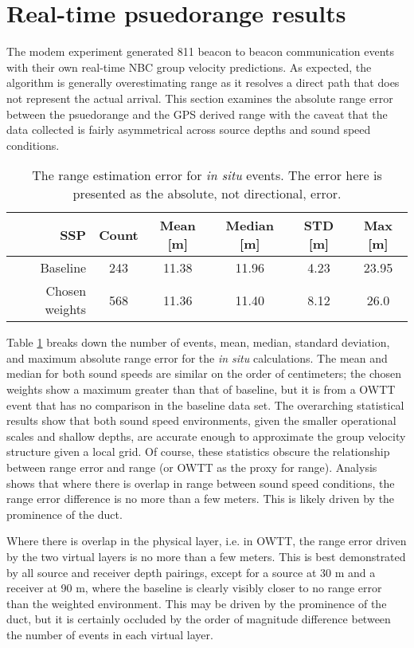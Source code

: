 \FloatBarrier
\section{\label{sec:4} Real-time psuedorange results}

The modem experiment generated 811 beacon to beacon communication events with their own real-time NBC group velocity predictions.
As expected, the algorithm is generally overestimating range as it resolves a direct path that does not represent the actual arrival.
This section examines the absolute range error between the psuedorange and the GPS derived range with the caveat that the data collected is fairly asymmetrical across source depths and sound speed conditions.

\begin{table}[h!]
\renewcommand{\arraystretch}{1.5}
\centering
\begin{tabular}{r|ccccc}
SSP & Count & Mean [m] & Median [m] & STD [m] & Max [m] \\ \hline
Baseline & 243 & 11.38 & 11.96 & 4.23 & 23.95 \\ 
Chosen weights & 568 & 11.36 & 11.40 & 8.12 & 26.0 \\
\end{tabular}
\caption[Range estimation error for \textit{in situ} events]{The range estimation error for \textit{in situ} events. The error here is presented as the absolute, not directional, error.}
\label{tab:rangeErrorInSitu}
\end{table}

Table \ref{tab:rangeErrorInSitu} breaks down the number of events, mean, median, standard deviation, and maximum absolute range error for the \textit{in situ} calculations.
The mean and median for both sound speeds are similar on the order of centimeters; the chosen weights show a maximum greater than that of baseline, but it is from a OWTT event that has no comparison in the baseline data set.
The overarching statistical results show that both sound speed environments, given the smaller operational scales and shallow depths, are accurate enough to approximate the group velocity structure given a local grid.
Of course, these statistics obscure the relationship between range error and range (or OWTT as the proxy for range).
Analysis shows that where there is overlap in range between sound speed conditions, the range error difference is no more than a few meters.
This is likely driven by the prominence of the duct.

Where there is overlap in the physical layer, i.e. in OWTT, the range error driven by the two virtual layers is no more than a few meters.
This is best demonstrated by all source and receiver depth pairings, except for a source at 30 m and a receiver at 90 m, where the baseline is clearly visibly closer to no range error than the weighted environment.
This may be driven by the prominence of the duct, but it is certainly occluded by the order of magnitude difference between the number of events in each virtual layer.

